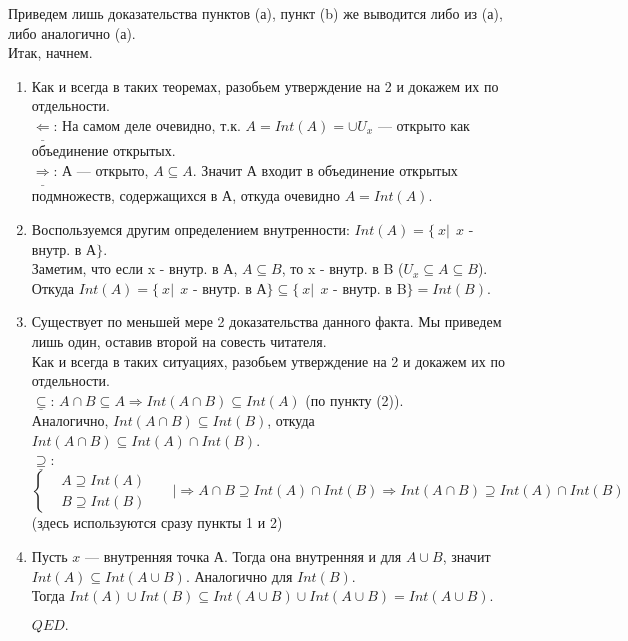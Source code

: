 \documentclass{article}
\begin{document}
\begin{spacing}{1.5}
\begin{enumerate}
\begin{enumerate}
\end{enumerate}
\end{enumerate}
Приведем лишь доказательства пунктов (а), пункт (b) же выводится либо из (а), либо аналогично (а).
\\ Итак, начнем.
\begin{enumerate}
\item Как и всегда в таких теоремах, разобьем утверждение на 2 и докажем их по отдельности.
\\ $\underline{\Leftarrow}$: На самом деле очевидно, т.к. $A = Int(A) = \cup U_{x}$ --- открыто как объединение открытых.
\\ $\underline{\Rightarrow}$: А --- открыто, $A\subseteq A$. Значит А входит в объединение открытых подмножеств, содержащихся в А, откуда очевидно $A = Int(A)$.
\item Воспользуемся другим определением внутренности: $Int(A) = \lbrace~x|~~x$ - внутр. в А$\rbrace$.
\\ Заметим, что если x - внутр. в А, $A\subseteq B$, то x - внутр. в B ($U_{x}\subseteq A\subseteq B$). Откуда $Int(A) = \lbrace~x|~~x$ - внутр. в А$\rbrace\subseteq\lbrace~x|~~x$ - внутр. в B$\rbrace=Int(B)$.
\item Существует по меньшей мере 2 доказательства данного факта. Мы приведем лишь один, оставив второй на совесть читателя.
\\ Как и всегда в таких ситуациях, разобьем утверждение на 2 и докажем их по отдельности.
\\ $\underline{\subseteq}$: $A\cap B\subseteq A\Longrightarrow Int(A\cap B)\subseteq Int(A)$ (по пункту (2)).
\\Аналогично,  $Int(A\cap B)\subseteq Int(B)$, откуда $Int(A\cap B)\subseteq Int(A)\cap Int(B)$.
\\ $\underline{\supseteq}$: \begin{equation*}
\begin{cases}
    & A\supseteq Int(A)\\
    & B\supseteq Int(B)
 \end{cases}~~~~~~~|\Longrightarrow A\cap B \supseteq Int(A)\cap Int(B)\Longrightarrow Int(A\cap B)\supseteq Int(A)\cap Int(B)
\end{equation*}
(здесь используются сразу пункты 1 и 2)
\item Пусть $x$ --- внутренняя точка А. Тогда она внутренняя и для $A\cup B$, значит $Int(A)\subseteq Int(A\cup B)$. Аналогично для $Int(B)$.
\\ Тогда $Int(A)\cup Int(B)\subseteq Int(A\cup B)\cup Int(A\cup B)=Int(A\cup B)$.
 \begin{flushright}
$QED.$
\end{flushright}
\end{enumerate}

\end{spacing}
\end{document}
